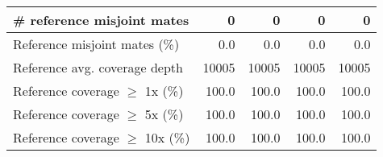 \documentclass[12pt,a4paper]{article}
\begin{document}
\begin{table}[ht]
\begin{center}
\begin{tabular}{|l*{4}{|r}|}
\# reference misjoint mates & 0 & 0 & 0 & 0 \\ \hline
Reference misjoint mates (\%) & 0.0 & 0.0 & 0.0 & 0.0 \\ \hline
Reference avg. coverage depth & 10005 & 10005 & 10005 & 10005 \\ \hline
Reference coverage $\geq$ 1x (\%) & 100.0 & 100.0 & 100.0 & 100.0 \\ \hline
Reference coverage $\geq$ 5x (\%) & 100.0 & 100.0 & 100.0 & 100.0 \\ \hline
Reference coverage $\geq$ 10x (\%) & 100.0 & 100.0 & 100.0 & 100.0 \\ \hline
\end{tabular}
\end{center}
\end{table}
\end{document}
